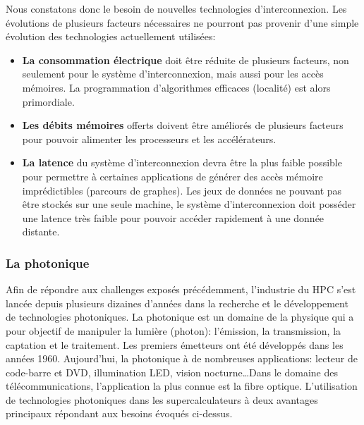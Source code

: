         Nous constatons donc le besoin de nouvelles technologies d'interconnexion. Les évolutions de plusieurs facteurs nécessaires ne pourront pas provenir d'une simple évolution des technologies actuellement utilisées:
        \begin{itemize}
            \item \textbf{La consommation électrique} doit être réduite de plusieurs facteurs, non seulement pour le système d'interconnexion, mais aussi pour les accès mémoires. La programmation d'algorithmes efficaces (localité) est alors primordiale. 
            \item \textbf{Les débits mémoires} offerts doivent être améliorés de plusieurs facteurs pour pouvoir alimenter les processeurs et les accélérateurs. 
            \item \textbf{La latence} du système d'interconnexion devra être la plus faible possible pour permettre à certaines applications de générer des accès mémoire imprédictibles (parcours de graphes). Les jeux de données ne pouvant pas être stockés sur une seule machine, le système d'interconnexion doit posséder une latence très faible pour pouvoir accéder rapidement à une donnée distante.
        \end{itemize}
    
    
    \subsubsection{La photonique}
    
        Afin de répondre aux challenges exposés précédemment, l'industrie du HPC s'est lancée depuis plusieurs dizaines d'années dans la recherche et le développement de technologies photoniques. La photonique est un domaine de la physique qui a pour objectif de manipuler la lumière (photon): l'émission, la transmission, la captation et le traitement. Les premiers émetteurs ont été développés dans les années 1960. Aujourd'hui, la photonique à de nombreuses applications: lecteur de code-barre et DVD, illumination LED, vision nocturne\ldots Dans le domaine des télécommunications, l'application la plus connue est la fibre optique. L'utilisation de technologies photoniques dans les supercalculateurs à deux avantages principaux répondant aux besoins évoqués ci-dessus.
       

